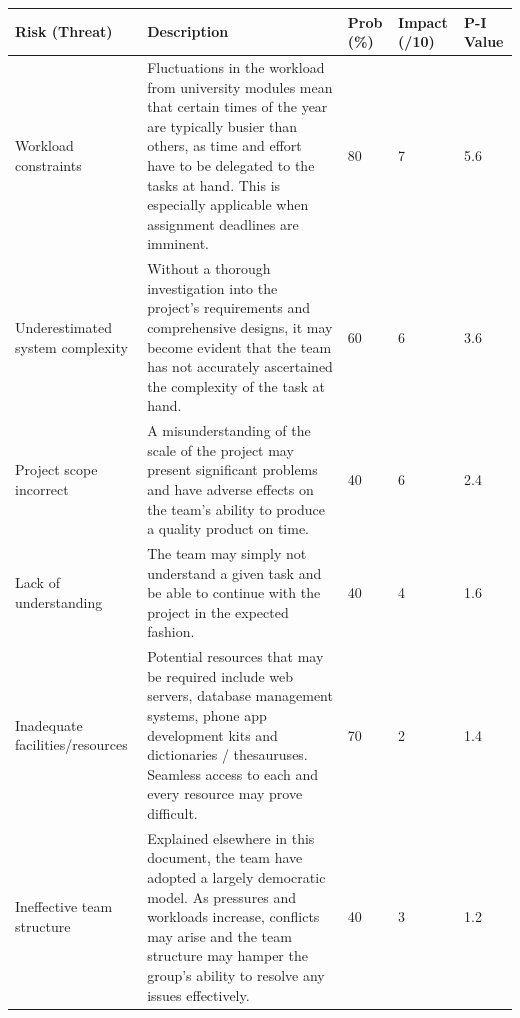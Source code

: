 \begin{table}[H]
	\centering
	\small
    \begin{tabular}{|p{2.5cm}|p{8.5cm}|p{1cm}|p{1cm}|p{1cm}|}
    \hline
    \textbf{Risk (Threat)} & \textbf{Description} & \textbf{Prob (\%)} & \textbf{Impact (/10)} & \textbf{P-I} Value \\ \hline
    Workload constraints              & Fluctuations in the workload from university modules mean that certain times of the year are typically busier than others, as time and effort have to be delegated to the tasks at hand. This is especially applicable when assignment deadlines are imminent. & 80              & 7            & 5.6       \\ \hline
    Underestimated system complexity & Without a thorough investigation into the project's requirements and comprehensive designs,  it may become evident that the team has not accurately ascertained the complexity of the task at hand.                                                            & 60              & 6            & 3.6       \\ \hline
    Project scope incorrect          & A misunderstanding of the scale of the project may present significant problems and have adverse effects on the team's ability to produce a quality product on time.                                                                                           & 40              & 6            & 2.4       \\ \hline
    Lack of understanding            & The team may simply not understand a given task and be able to continue with the project in the expected fashion.                                                                                                                                              & 40              & 4            & 1.6       \\ \hline
    Inadequate facilities/resources  & Potential resources that may be required include web servers, database management systems, phone app development kits and dictionaries / thesauruses. Seamless access to each and every resource may prove difficult.                                          & 70              & 2            & 1.4       \\ \hline
    Ineffective team structure      & Explained elsewhere in this document, the team have adopted a largely democratic model. As pressures and workloads increase, conflicts may arise and the team structure may hamper the group's ability to resolve any issues effectively.                      & 40              & 3            & 1.2       \\ \hline

\end{tabular}
\end{table}
